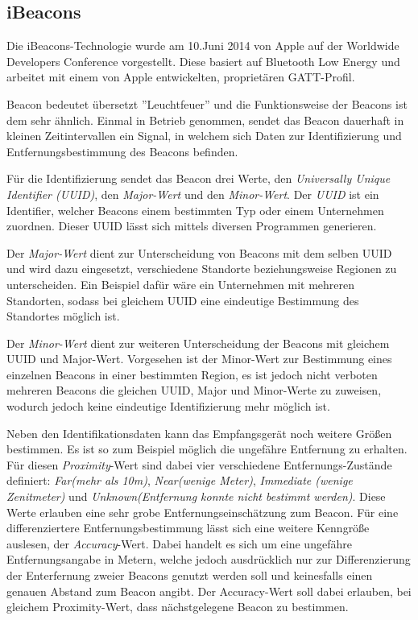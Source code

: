 \subsection{iBeacons}
\label{sec:technologies:bluetoothLE:ibeacons}
Die iBeacons-Technologie wurde am 10.Juni 2014 von Apple auf der Worldwide Developers Conference vorgestellt. 
Diese basiert auf Bluetooth Low Energy und arbeitet mit einem von Apple entwickelten, proprietären GATT-Profil.

Beacon bedeutet übersetzt ''Leuchtfeuer'' und die Funktionsweise der Beacons ist dem sehr ähnlich.
Einmal in Betrieb genommen, sendet das Beacon dauerhaft in kleinen Zeitintervallen ein Signal, in welchem sich Daten zur Identifizierung und Entfernungsbestimmung des Beacons befinden.

Für die Identifizierung sendet das Beacon drei Werte, den \emph{Universally Unique Identifier (UUID)}, den \emph{Major-Wert} und den \emph{Minor-Wert}.
Der \emph{UUID} ist ein Identifier, welcher Beacons einem bestimmten Typ oder einem Unternehmen zuordnen. Dieser UUID lässt sich mittels diversen Programmen generieren.

Der \emph{Major-Wert} dient zur Unterscheidung von Beacons mit dem selben UUID und wird dazu eingesetzt, verschiedene Standorte beziehungsweise Regionen zu unterscheiden. Ein Beispiel dafür wäre ein Unternehmen mit mehreren Standorten, sodass bei gleichem UUID eine eindeutige Bestimmung des Standortes möglich ist.

Der \emph{Minor-Wert} dient zur weiteren Unterscheidung der Beacons mit gleichem UUID und Major-Wert. Vorgesehen ist der Minor-Wert zur Bestimmung eines einzelnen Beacons in einer bestimmten Region, es ist jedoch nicht verboten mehreren Beacons die gleichen UUID, Major und Minor-Werte zu zuweisen, wodurch jedoch keine eindeutige Identifizierung mehr möglich ist. 

Neben den Identifikationsdaten kann das Empfangsgerät noch weitere Größen bestimmen. Es ist so zum Beispiel möglich die ungefähre Entfernung zu erhalten. 
Für diesen \emph{Proximity}-Wert sind dabei vier verschiedene Entfernungs-Zustände definiert: \textit{Far(mehr als 10m)}, \textit{Near(wenige Meter)}, \textit{Immediate (wenige Zenitmeter)} und \textit{Unknown(Entfernung konnte nicht bestimmt werden)}. Diese Werte erlauben eine sehr grobe Entfernungseinschätzung zum Beacon. Für eine differenziertere Entfernungsbestimmung lässt sich eine weitere Kenngröße auslesen, der \textit{Accuracy}-Wert. Dabei handelt es sich um eine ungefähre Entfernungsangabe in Metern, welche jedoch ausdrücklich nur zur Differenzierung der Enterfernung zweier Beacons genutzt werden soll und keinesfalls einen genauen Abstand zum Beacon angibt. Der Accuracy-Wert soll dabei erlauben, bei gleichem Proximity-Wert, dass nächstgelegene Beacon zu bestimmen.

